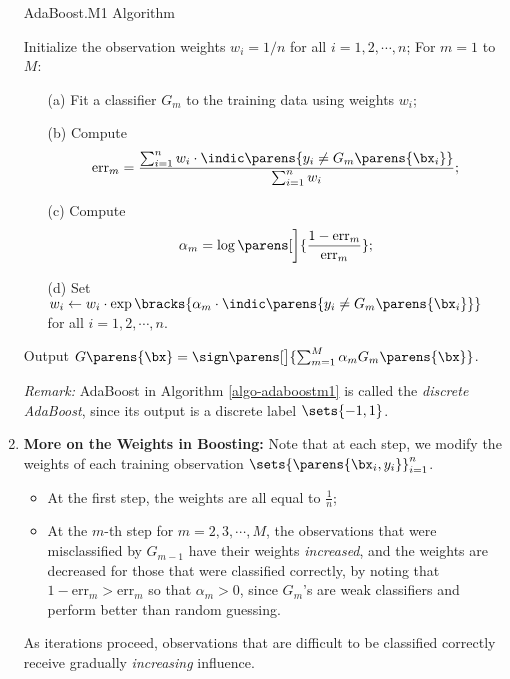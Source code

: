 \documentclass[12pt]{article}
\begin{document}
\begin{enumerate}[label=\textbf{\arabic*.}]
	\begin{minipage}{\linewidth}
		\begin{algorithm}[H]
			\caption{AdaBoost.M1 Algorithm}\label{algo-adaboostm1}
			\begin{algorithmic}[1]
				\STATE Initialize the observation weights $w_i = 1 / n$ for all $i = 1, 2, \cdots, n$; 
				\STATE For $m = 1$ to $M$: 
				\begin{enumerate}
					\item[(a)] Fit a classifier $G_m$ to the training data using weights $w_i$; 
					\item[(b)] Compute
					\begin{align*}
						\mathrm{err}_m = \frac{\sum_{i=1}^n w_i \cdot \indic \parens{y_i \ne G_m \parens{\bx_i}} }{\sum_{i=1}^n w_i}; 
					\end{align*}
					\item[(c)] Compute
					\begin{align*}
						\alpha_m = \log \parens[\bigg]{\frac{1 - \text{err}_m}{\text{err}_m}}; 
					\end{align*}
					\item[(d)] Set $w_i \leftarrow w_i \cdot \exp \bracks{\alpha_m \cdot \indic \parens{y_i \ne G_m \parens{\bx_i}}}$ for all $i = 1, 2, \cdots, n$. 
				\end{enumerate}
				\STATE Output $G \parens{\bx} = \sign \parens[\big]{\sum_{m=1}^M \alpha_m G_m \parens{\bx}}$. 
			\end{algorithmic}
		\end{algorithm}
	\end{minipage}
	
	\vspace{10pt}
	
	\textit{Remark:} AdaBoost in Algorithm \ref{algo-adaboostm1} is called the \textit{discrete AdaBoost}, since its output is a discrete label $\sets{-1, 1}$. 
	
	\item \textbf{More on the Weights in Boosting:} Note that at each step, we modify the weights of each training observation $\sets{\parens{\bx_i, y_i}}_{i=1}^n$. 
	\begin{itemize}
		\item At the first step, the weights are all equal to $\frac{1}{n}$; 
		\item At the $m$-th step for $m = 2, 3, \cdots, M$, the observations that were misclassified by $G_{m-1}$ have their weights \emph{increased}, and the weights are decreased for those that were classified correctly, by noting that $1 - \text{err}_m > \text{err}_m$ so that $\alpha_m > 0$, since $G_m$'s are weak classifiers and perform better than random guessing. 
	\end{itemize}
	As iterations proceed, observations that are difficult to be classified correctly receive gradually \emph{increasing} influence. 
	
\end{enumerate}
\end{document}
